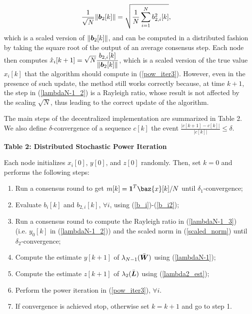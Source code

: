 \documentclass[10pt,twocolumn]{IEEEtran}
\def\bL{\mbox{\boldmath $L$}}
\def\bW{\mbox{\boldmath $W$}}
\def\bb{\mbox{\boldmath $b$}}
\def\bx{\baz{x}}
\begin{document}
\begin{equation}\label{scaled_norm}
\frac{1}{\sqrt{N}}\|\bb_2[k]\|=\sqrt{\frac{1}{N}\sum_{i=1}^N b^2_{2,i}[k]},
\end{equation}
which is a scaled version of $\|\bb_2[k]\|$, and can be computed in a distributed fashion by taking the square root of the output of an average consensus step. Each node then computes $\displaystyle \hat{x}_i[k+1]=\sqrt{N}\frac{b_{2,i}[k]}{\|\bb_2[k]\|}$,
which is a scaled version of the true value $x_i[k]$ that the algorithm should compute in (\ref{pow_iter3}). However, even in the presence of such update, the method still works correctly because, at time $k+1$, the step in (\ref{lambdaN-1_2}) is a Rayleigh ratio, whose result is not affected by the scaling $\sqrt{N}$, thus leading to the correct update of the algorithm.

The main steps of the decentralized implementation are summarized in Table 2. We also define $\delta$-convergence of a sequence $c[k]$ the event $\displaystyle\frac{|c[k+1]-c[k]|}{|c[k]|}\leq\delta$.

\begin{algorithm}
\caption*{\textbf{Table 2: Distributed Stochastic Power Iteration}}

\vspace{.2cm}
Each node initializes $x_i[0]$, $y[0]$, and $z[0]$ randomly. Then, set $k=0$ and performs the following steps:

\begin{enumerate}
  \item Run a consensus round to get $\displaystyle m[k]=\mathbf{1}^T\bx[k]/N$ until $\delta_1$-convergence;
  \item Evaluate $b_i[k]$ and $b_{2,i}[k]$, $\forall i$, using (\ref{b_i})-(\ref{b_i2});
  \item Run a consensus round to compute the Rayleigh ratio in (\ref{lambdaN-1_3}) (i.e. $y_0[k]$ in (\ref{lambdaN-1_2})) and the scaled norm in (\ref{scaled_norm}) until $\delta_2$-convergence;
  \item Compute the estimate $y[k+1]$ of $\lambda_{N-1}(\bar{\bW})$ using (\ref{lambdaN-1});
  \item Compute the estimate $z[k+1]$ of $\lambda_{2}(\bar{\bL})$ using (\ref{lambda2_est});
  \item Perform the power iteration in (\ref{pow_iter3}), $\forall i$.
  \item If convergence is achieved stop, otherwise set $k=k+1$ and go to step 1.
\end{enumerate}
\end{algorithm}
\end{document}
